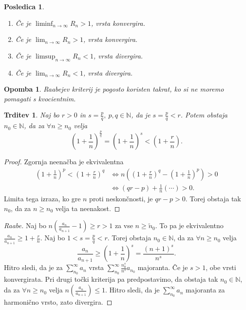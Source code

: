 \documentclass[10pt, a4paper]{article}
\newtheorem{posledica}[izr]{Posledica}
\newtheorem{trditev}[izr]{Trditev}
\newtheorem*{opomba}{Opomba}
\newenvironment{noticeC}{%
  \tcolorbox[%
  notitle,
  empty,
  enhanced,  %
  breakable,
  coltext=black, 
  fontupper=\rmfamily,
  parbox=false,
  noparskip,
  sharp corners,
  boxrule=-1pt,  %
  frame hidden,
  left=7pt,  %
  right=7pt,
  top=5pt,
  bottom=5pt,
  before skip=2.5ex plus 2pt,
  after skip=2.5ex plus 2pt,
  overlay unbroken and last={%
  },
  ]}
{\endtcolorbox}
\newenvironment{dokaz}%
  {\begin{noticeC}\begin{proof}}%
  {\end{proof}\end{noticeC}}
\newcommand{\N}{\mathbb {N}}
\begin{document}
\begin{posledica}
    \begin{enumerate}
        \item Če je $\liminf_{n \to \infty} R_n > 1$, vrsta konvergira.
        \item Če je $\lim_{n \to \infty} R_n > 1$, vrsta konvergira.
        \item Če je $\limsup_{n \to \infty} R_n < 1$, vrsta divergira.
        \item Če je $\lim_{n \to \infty} R_n < 1$, vrsta divergira.
    \end{enumerate}
\end{posledica}

\begin{opomba}
    Raabejev kriterij je pogosto koristen takrat, ko si ne moremo pomagati s kvocientnim.
\end{opomba}

\begin{trditev}
    Naj bo $r > 0$ in $s = \frac{p}{q},\ p,q \in \N$, da je $s = \frac{p}{q} < r$.
    Potem obstaja $n_0 \in \N$, da za $\forall n \geq n_0$ velja $$\left(1 + \frac{1}{n}\right)^{\frac{p}{q}} = \left(1 + \frac{1}{n}\right)^s < \left(1 + \frac{r}{n}\right).$$
\end{trditev}

\begin{dokaz}
    Zgornja neenačba je ekvivalentna
    \begin{align*}
        \left(1 + \frac{1}{n}\right)^{p} < \left(1 + \frac{r}{n}\right)^q &\iff n \left( \left(1 + \frac{r}{n}\right)^q - \left(1 + \frac{1}{n}\right)^{p}\right) > 0\\
        &\iff (qr - p) + \frac{1}{n} (\cdots)> 0 .
    \end{align*}
    Limita tega izraza, ko gre $n$ proti neskončnosti, je $qr - p > 0$.
    Torej obstaja tak $n_0$, da za $n \geq n_0$ velja ta neenakost.
\end{dokaz}

\begin{dokaz}[Raabe]
    Naj bo $n \left(\frac{a_n}{a_{n+1}} - 1 \right) \geq r > 1$ za vse $n \geq \tilde{n}_0$.
    To pa je ekvivalentno $\frac{a_n}{a_{n+1}} \geq 1 + \frac{r}{n}$.
    Naj bo $1 < s = \frac{p}{q} < r$.
    Torej obstaja $n_0 \in \N$, da za $\forall n \geq n_0$ velja
    $$\frac{a_n}{a_{n+1}} \geq (1 + \frac{1}{n})^s = \frac{(n+1)^s}{n^s}.$$
    Hitro sledi, da je za $\sum_{n_0} ^\infty a_n$ vrsta $\sum_{n_0} ^\infty \frac{n_0 ^s}{n^s} a_{n_0}$ majoranta.
    Če je $s > 1$, obe vrsti konvergirata.
    Pri drugi točki kriterija pa predpostavimo, da obstaja tak $n_0 \in \N$, da za $\forall n \geq n_0$ velja $n \left( \frac{a_n}{a_{n+1}} \right) \leq 1.$
    Hitro sledi, da je $\sum_{n_0} ^\infty a_n$ majoranta za harmonično vrsto, zato divergira.
\end{dokaz}
\end{document}
